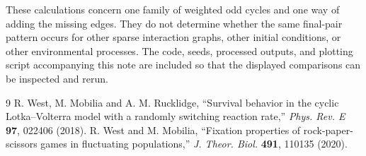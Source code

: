 \documentclass[10pt,a4paper]{article}
\begin{document}
These calculations concern one family of weighted odd cycles and one way of adding the missing edges.  They do not determine whether the same final-pair pattern occurs for other sparse interaction graphs, other initial conditions, or other environmental processes.  The code, seeds, processed outputs, and plotting script accompanying this note are included so that the displayed comparisons can be inspected and rerun.

\vspace{2pt}
\begin{thebibliography}{9}\small
{} R. West, M. Mobilia and A. M. Rucklidge, ``Survival behavior in the cyclic Lotka--Volterra model with a randomly switching reaction rate,'' \emph{Phys. Rev. E} \textbf{97}, 022406 (2018).
 R. West and M. Mobilia, ``Fixation properties of rock-paper-scissors games in fluctuating populations,'' \emph{J. Theor. Biol.} \textbf{491}, 110135 (2020).
\end{thebibliography}
\end{document}
